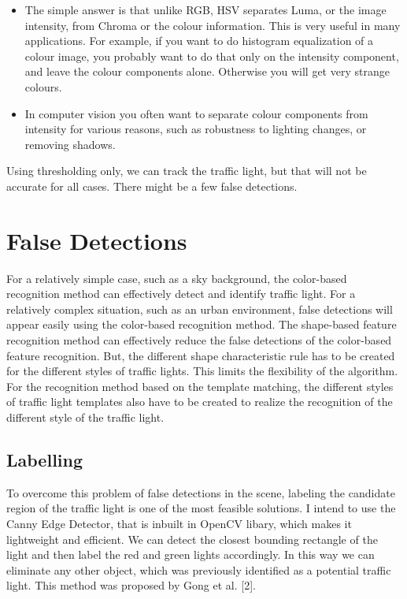 \begin{itemize}
	\item The simple answer is that unlike RGB, HSV separates Luma, or the image intensity, from Chroma or the colour information. This is very useful in many applications. For example, if you want to do histogram equalization of a colour image, you probably want to do that only on the intensity component, and leave the colour components alone. Otherwise you will get very strange colours.
	\item In computer vision you often want to separate colour components from intensity for various reasons, such as robustness to lighting changes, or removing shadows.
	
\end{itemize}

Using thresholding only, we can track the traffic light, but that will not be accurate for all cases. There might be a few false detections.

\section{False Detections}

For a relatively simple case, such as a sky background, the color-based recognition method can effectively detect and identify traffic light. For a relatively complex situation, such as an urban environment, false detections will appear easily using the color-based recognition method. The shape-based feature recognition method can effectively reduce the false detections of the color-based feature recognition. But, the different shape characteristic rule has to be created for the different styles of traffic lights. This limits the flexibility of the algorithm. For the recognition method based on the template matching, the different styles of traffic light templates also have to be created to realize the recognition of the different style of the traffic light.

\subsection{Labelling}
To overcome this problem of false detections in the scene, labeling the candidate region of the traffic light is one of the most feasible solutions. I intend to use the Canny Edge Detector, that is inbuilt in OpenCV libary, which makes it lightweight and efficient. We can detect the closest bounding rectangle of the light and then label the red and green lights accordingly. In this way we can eliminate any other object, which was previously identified as a potential traffic light.  This method was proposed by Gong et al. [2].

